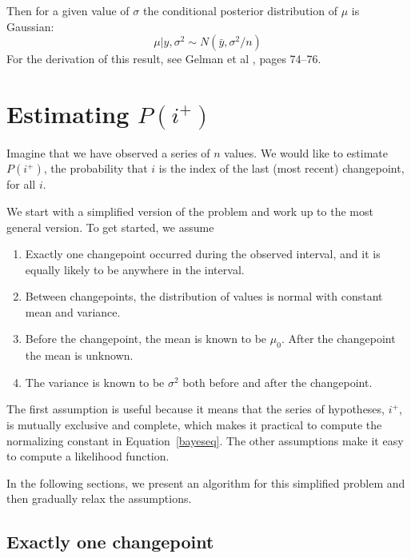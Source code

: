 \documentclass[twocolumn,11pt]{article}
\begin{document}
Then for a given value of $\sigma$ the conditional posterior
distribution of $\mu$ is Gaussian:
%
\begin{equation}
\label{mupost}
\mu|y,\sigma^2 \sim N(\bar{y}, \sigma^2/n )
\end{equation}
%
For the derivation of this result, see Gelman et al
\cite{gelman03bayesian}, pages 74--76.



\section{Estimating $P(i^+)$}
\label{estimation}

Imagine that we have observed a series of $n$ values.  We would like
to estimate $P(i^+)$, the probability that $i$ is the index of the last
(most recent) changepoint, for all $i$.

We start with a simplified version of the problem and work
up to the most general version.
To get started, we assume 

\begin{enumerate}

\item Exactly one changepoint occurred
during the observed interval, and it is equally likely to be
anywhere in the interval.

\item Between changepoints, the distribution of values is normal
with constant mean and variance.

\item Before the changepoint, the mean is known to be $\mu_0$.  After
the changepoint the mean is unknown.

\item The variance is known to be $\sigma^2$ both before and after
the changepoint.

\end{enumerate}

The first assumption is useful because it means that the series of
hypotheses, $i^+$, is mutually exclusive and complete, which makes it
practical to compute the normalizing constant in
Equation~\ref{bayeseq}.  The other assumptions make it easy to compute
a likelihood function.

In the following sections, we present an algorithm for this
simplified problem and then gradually relax the assumptions.


\subsection{Exactly one changepoint}
\label{likefun}
\end{document}
